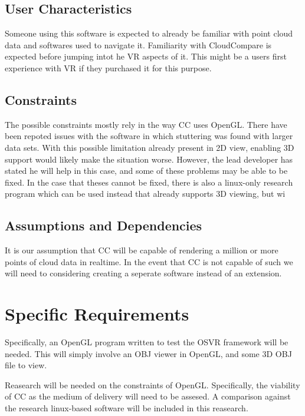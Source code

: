 \documentclass[titlepage]{article}
\begin{document}
\subsection{User Characteristics}

Someone using this software is expected to already be familiar with point cloud data and softwares used to navigate it. 
Familiarity with CloudCompare is expected before jumping intot he VR aspects of it.
This might be a users first experience with VR if they purchased it for this purpose.

\subsection{Constraints}

The possible constraints mostly rely in the way CC uses OpenGL. There have been repoted issues with the software in which
stuttering was found with larger data sets. With this possible limitation already present in 2D view, enabling 3D support would
likely make the situation worse. However, the lead developer has stated he will help in this case, and some of these problems 
may be able to be fixed. In the case that theses cannot be fixed, there is also a linux-only research program which can be used
instead that already supports 3D viewing, but wi

\subsection{Assumptions and Dependencies}

It is our assumption that CC will be capable of rendering a million or more points of cloud data in realtime.
In the event that CC is not capable of such we will need to considering creating a seperate software instead of an extension.

\section{Specific Requirements}

Specifically, an OpenGL program written to test the OSVR framework will be needed. This will simply involve an OBJ viewer in OpenGL,
and some 3D OBJ file to view. 

Reasearch will be needed on the constraints of OpenGL. Specifically, the viability of CC as the medium of delivery will need to be
assesed. A comparison against the research linux-based software will be included in this reasearch.
\end{document}
